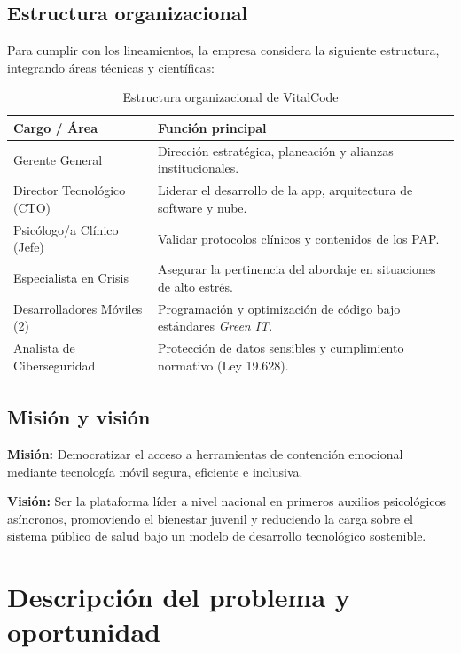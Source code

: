 \documentclass[12pt,letterpaper]{article}
\begin{document}
\subsection{Estructura organizacional}
Para cumplir con los lineamientos, la empresa considera la siguiente estructura, integrando áreas técnicas y científicas:

\begin{table}[H]
\centering
\caption{Estructura organizacional de VitalCode}
\begin{tabularx}{\textwidth}{p{4.5cm} X}
\toprule
\textbf{Cargo / Área} & \textbf{Función principal} \\
\midrule
Gerente General & Dirección estratégica, planeación y alianzas institucionales. \\
Director Tecnológico (CTO) & Liderar el desarrollo de la app, arquitectura de software y nube. \\
Psicólogo/a Clínico (Jefe) & Validar protocolos clínicos y contenidos de los PAP. \\
Especialista en Crisis & Asegurar la pertinencia del abordaje en situaciones de alto estrés. \\
Desarrolladores Móviles (2) & Programación y optimización de código bajo estándares \textit{Green IT}. \\
Analista de Ciberseguridad & Protección de datos sensibles y cumplimiento normativo (Ley 19.628). \\
\bottomrule
\end{tabularx}
\end{table}

\subsection{Misión y visión}
\textbf{Misión:} Democratizar el acceso a herramientas de contención emocional mediante tecnología móvil segura, eficiente e inclusiva.

\textbf{Visión:} Ser la plataforma líder a nivel nacional en primeros auxilios psicológicos asíncronos, promoviendo el bienestar juvenil y reduciendo la carga sobre el sistema público de salud bajo un modelo de desarrollo tecnológico sostenible.

\section{Descripción del problema y oportunidad}
\end{document}
